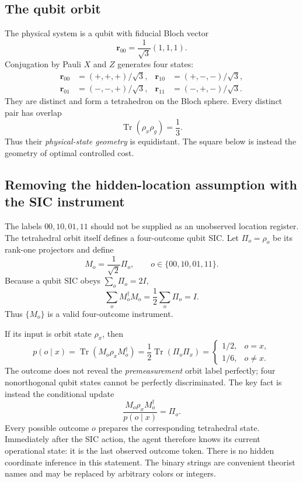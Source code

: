 \documentclass[11pt]{article}
\theoremstyle{definition}
\theoremstyle{remark}
\newcommand{\Tr}{\operatorname{Tr}}
\begin{document}
\subsection{The qubit orbit}

The physical system is a qubit with fiducial Bloch vector
\[
  \bm r_{00}=\frac1{\sqrt3}(1,1,1).
\]
Conjugation by Pauli \(X\) and \(Z\) generates four states:
\begin{align*}
 \bm r_{00}&=(+,+,+)/\sqrt3,&
 \bm r_{10}&=(+,-,-)/\sqrt3,\\
 \bm r_{01}&=(-,-,+)/\sqrt3,&
 \bm r_{11}&=(-,+,-)/\sqrt3.
\end{align*}
They are distinct and form a tetrahedron on the Bloch sphere.  Every distinct
pair has overlap
\[
  \Tr(\rho_x\rho_g)=\frac13.
\]
Thus their \emph{physical-state geometry} is equidistant.  The square below
is instead the geometry of optimal controlled cost.

\subsection{Removing the hidden-location assumption with the SIC instrument}
\label{sec:sic-anchor}

The labels \(00,10,01,11\) should not be supplied as an unobserved location
register. The tetrahedral orbit itself defines a four-outcome qubit SIC. Let
\(\Pi_o=\rho_o\) be its rank-one projectors and define
\begin{equation}
 M_o=\frac{1}{\sqrt2}\Pi_o,
 \qquad o\in\{00,10,01,11\}.
 \label{eq:sic-kraus}
\end{equation}
Because a qubit SIC obeys \(\sum_o\Pi_o=2I\),
\[
 \sum_oM_o^\dagger M_o=\frac12\sum_o\Pi_o=I.
\]
Thus \(\{M_o\}\) is a valid four-outcome instrument.

If its input is orbit state \(\rho_x\), then
\begin{equation}
 p(o\mid x)=\Tr(M_o\rho_xM_o^\dagger)
 =\frac12\Tr(\Pi_o\Pi_x)
 =\begin{cases}
 1/2,&o=x,\\
 1/6,&o\ne x.
 \end{cases}
 \label{eq:sic-kernel}
\end{equation}
The outcome does not reveal the \emph{premeasurement} orbit label perfectly;
four nonorthogonal qubit states cannot be perfectly discriminated. The key
fact is instead the conditional update
\begin{equation}
 \frac{M_o\rho_xM_o^\dagger}{p(o\mid x)}=\Pi_o.
 \label{eq:sic-prepares}
\end{equation}
Every possible outcome \(o\) prepares the corresponding tetrahedral state.
Immediately after the SIC action, the agent therefore knows its current
operational state: it is the last observed outcome token. There is no hidden
coordinate inference in this statement. The binary strings are convenient
theorist names and may be replaced by arbitrary colors or integers.
\end{document}
